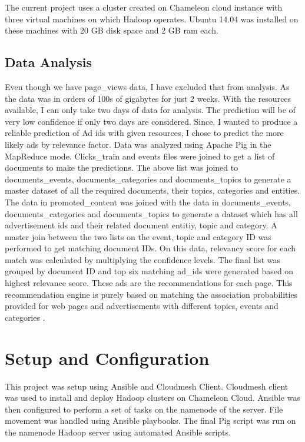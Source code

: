 \documentclass[9pt,twocolumn,twoside]{../../styles/osajnl}
\begin{document}
The current project uses a cluster created on Chameleon cloud instance with three virtual machines on which Hadoop operates. Ubuntu 14.04 was installed on these machines with 20 GB disk space and 2 GB ram each.

\subsection{Data Analysis}
Even though we have page\_views data, I have excluded that from analysis. As the data was in orders of 100s of gigabytes for just 2 weeks. With the resources available, I can only take two days of data for analysis. The prediction will be of very low confidence if only two days are considered. Since, I wanted to produce a reliable prediction of Ad ids with given resources, I chose to predict the more likely ads by relevance factor. Data was analyzed using Apache Pig in the MapReduce mode. Clicks\_train and events files were joined to get a list of documents to make the predictions. The above list was joined to documents\_events, documents\_categories and documents\_topics to generate a master dataset of all the required documents, their topics, categories and entities. The data in promoted\_content was joined with the data in documents\_events, documents\_categories and documents\_topics to generate a dataset which has all advertisement ids and their related document entitiy, topic and category. A master join between the two lists on the event, topic and category ID was performed to get matching document IDs. On this data, relevancy score for each match was calculated by multiplying the confidence levels. The final list was grouped by document ID and top six matching ad\_ids were generated based on highest relevance score. These ads are the recommendations for each page. This recommendation engine is purely based on matching the association probabilities provided for web pages and advertisements with different topics, events and categories .

\section{Setup and Configuration}
This project was setup using Ansible and Cloudmesh Client. Cloudmesh client was used to install and deploy Hadoop clusters on Chameleon Cloud. Ansible was then configured to perform a set of tasks on the namenode of the server. File movement was handled using Ansible playbooks. The final Pig script was run on the namenode Hadoop server using automated Ansible scripts.
\end{document}
